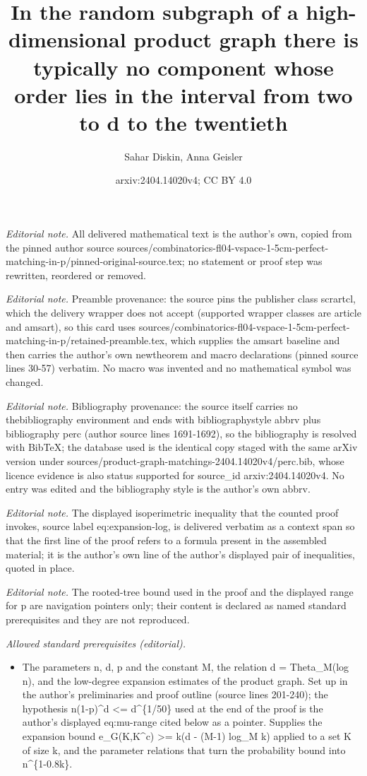 \documentclass[10pt,a4paper]{amsart}
\title{In the random subgraph of a high-dimensional product graph there is typically no component whose order lies in the interval from two to d to the twentieth}
\author{Sahar Diskin, Anna Geisler}
\date{arxiv:2404.14020v4; CC BY 4.0}
\begin{document}
\maketitle
\noindent\textit{Editorial note.} All delivered mathematical text is the author's own, copied from the pinned author source sources/combinatorics-fl04-vspace-1-5cm-perfect-matching-in-p/pinned-original-source.tex; no statement or proof step was rewritten, reordered or removed.\par\medskip
\noindent\textit{Editorial note.} Preamble provenance: the source pins the publisher class scrartcl, which the delivery wrapper does not accept (supported wrapper classes are article and amsart), so this card uses sources/combinatorics-fl04-vspace-1-5cm-perfect-matching-in-p/retained-preamble.tex, which supplies the amsart baseline and then carries the author's own newtheorem and macro declarations (pinned source lines 30-57) verbatim. No macro was invented and no mathematical symbol was changed.\par\medskip
\noindent\textit{Editorial note.} Bibliography provenance: the source itself carries no thebibliography environment and ends with bibliographystyle abbrv plus bibliography perc (author source lines 1691-1692), so the bibliography is resolved with BibTeX; the database used is the identical copy staged with the same arXiv version under sources/product-graph-matchings-2404.14020v4/perc.bib, whose licence evidence is also status supported for source\_id arxiv:2404.14020v4. No entry was edited and the bibliography style is the author's own abbrv.\par\medskip
\noindent\textit{Editorial note.} The displayed isoperimetric inequality that the counted proof invokes, source label eq:expansion-log, is delivered verbatim as a context span so that the first line of the proof refers to a formula present in the assembled material; it is the author's own line of the author's displayed pair of inequalities, quoted in place.\par\medskip
\noindent\textit{Editorial note.} The rooted-tree bound used in the proof and the displayed range for p are navigation pointers only; their content is declared as named standard prerequisites and they are not reproduced.\par\medskip
\noindent\textit{Allowed standard prerequisites (editorial).}\begin{itemize}
\item The parameters n, d, p and the constant M, the relation d = Theta\_M(log n), and the low-degree expansion estimates of the product graph. Set up in the author's preliminaries and proof outline (source lines 201-240); the hypothesis n(1-p)\textasciicircum{}d <= d\textasciicircum{}\{1/50\} used at the end of the proof is the author's displayed eq:mu-range cited below as a pointer. Supplies the expansion bound e\_G(K,K\textasciicircum{}c) >= k(d - (M-1) log\_M k) applied to a set K of size k, and the parameter relations that turn the probability bound into n\textasciicircum{}\{1-0.8k\}.
\end{itemize}\medskip
\end{document}
